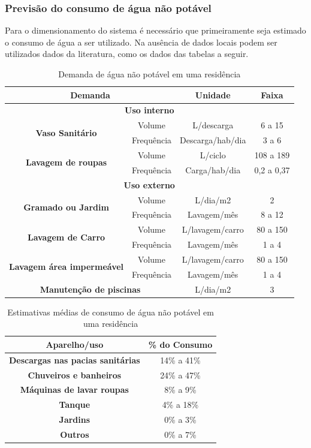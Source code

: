 \subsubsection{Previsão do consumo de água não potável}

Para o dimensionamento do sistema é necessário que primeiramente seja estimado o consumo de água a ser utilizado. Na ausência de dados locais podem ser utilizados dados da literatura, como os dados das tabelas a seguir.

\begin{table}[H]
\centering
\begin{tabular}{|c|c|c|c|}
\hline 
\multicolumn{2}{|c|}{\textbf{Demanda}} & \textbf{Unidade} & \textbf{Faixa}\tabularnewline
\hline 
\hline 
\multicolumn{4}{|c|}{\textbf{Uso interno}}\tabularnewline
\hline 
\multirow{2}{*}{\textbf{Vaso Sanitário}} & Volume & L/descarga & 6 a 15\tabularnewline
\cline{2-4} 
 & Frequência & Descarga/hab/dia & 3 a 6\tabularnewline
\hline 
\multirow{2}{*}{\textbf{Lavagem de roupas}} & Volume & L/ciclo & 108 a 189\tabularnewline
\cline{2-4} 
 & Frequência & Carga/hab/dia & 0,2 a 0,37\tabularnewline
\hline 
\multicolumn{4}{|c|}{\textbf{Uso externo}}\tabularnewline
\hline 
\multirow{2}{*}{\textbf{Gramado ou Jardim}} & Volume & L/dia/m2 & 2\tabularnewline
\cline{2-4} 
 & Frequência & Lavagem/mês & 8 a 12\tabularnewline
\hline 
\multirow{2}{*}{\textbf{Lavagem de Carro}} & Volume & L/lavagem/carro & 80 a 150\tabularnewline
\cline{2-4} 
 & Frequência & Lavagem/mês & 1 a 4\tabularnewline
\hline 
\multirow{2}{*}{\textbf{Lavagem área impermeável}} & Volume & L/lavagem/carro & 80 a 150\tabularnewline
\cline{2-4} 
 & Frequência & Lavagem/mês & 1 a 4\tabularnewline
\hline 
\multicolumn{2}{|c|}{\textbf{Manutenção de piscinas}} & L/dia/m2 & 3\tabularnewline
\hline 
\end{tabular}
\caption{Demanda de água não potável em uma residência\cite{FAdaptado de TOMAZ,2003}}
\label{demanda_de_agua}
\end{table}

\begin{table}[H]
\centering
\begin{tabular}{|c|c|}
\hline 
\textbf{Aparelho/uso} & \textbf{\% do Consumo}\tabularnewline
\hline 
\hline 
\textbf{Descargas nas pacias sanitárias} & 14\% a 41\%\tabularnewline
\hline 
\textbf{Chuveiros e banheiros} & 24\% a 47\%\tabularnewline
\hline 
\textbf{Máquinas de lavar roupas} & 8\% a 9\%\tabularnewline
\hline 
\textbf{Tanque} & 4\% a 18\%\tabularnewline
\hline 
\textbf{Jardins} & 0\% a 3\%\tabularnewline
\hline 
\textbf{Outros} & 0\% a 7\%\tabularnewline
\hline 
\end{tabular}
\caption{Estimativas médias de consumo de água não potável em uma residência}
\label{}
\end{table}

